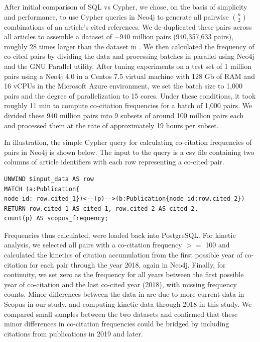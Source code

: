 \documentclass[11pt, oneside]{article}   	%
\begin{document}
After initial comparison of SQL vs Cypher, we chose, on the basis of simplicity and performance, to use Cypher queries in Neo4j to generate all pairwise $n\choose 2$ combinations of an article's cited references. We de-duplicated these pairs across all articles to assemble a dataset of $\sim$940 million pairs (940,357,633 pairs), roughly 28 times larger than the dataset in \cite{devarakonda_2020}. We then calculated the frequency of co-cited pairs by dividing the data and processing batches in parallel using Neo4j and the GNU Parallel utility.  After tuning experiments on a test set of 1 million pairs using a Neo4j 4.0 in a Centos 7.5 virtual machine with 128 Gb of RAM and 16 vCPUs in the Microsoft Azure environment, we set the batch size to 1,000 pairs and the degree of parallelization to 15 cores. Under these conditions, it took roughly 11 min to compute co-citation frequencies for a batch of 1,000 pairs. We divided these 940 million pairs into 9 subsets of around 100 million pairs each and processed them at the rate of approximately 19 hours per subset.  

In illustration, the simple Cypher query for calculating co-citation frequencies of pairs in Neo4j is shown below. The input to the query is a csv file containing two columns of article identifiers with each row representing a co-cited pair.  
\vspace{2 mm}
\lstset{language=Pascal, basicstyle=\footnotesize} 
\begin{lstlisting}
UNWIND $input_data AS row
MATCH (a:Publication{
node_id: row.cited_1})<--(p)-->(b:Publication{node_id:row.cited_2})
RETURN row.cited_1 AS cited_1, row.cited_2 AS cited_2, 
count(p) AS scopus_frequency;
\end{lstlisting}


Frequencies thus calculated, were loaded back into PostgreSQL. For kinetic analysis, we selected all pairs with a co-citation frequency $>=$ 100 and calculated the kinetics of citation accumulation from the first possible year of co-citation for each pair through the year 2018, again in Neo4j.  Finally, for continuity, we set zero as the frequency for all years between the first possible year of co-citation and the last co-cited year (2018), with  missing frequency counts. Minor differences between the data in  \cite{devarakonda_2020} are due to more current data in Scopus in our study, and computing kinetic data through 2018 in this study. We compared small samples between the two datasets and confirmed that these minor differences in co-citation frequencies could be bridged by including citations from publications in 2019 and later. 
\end{document}
